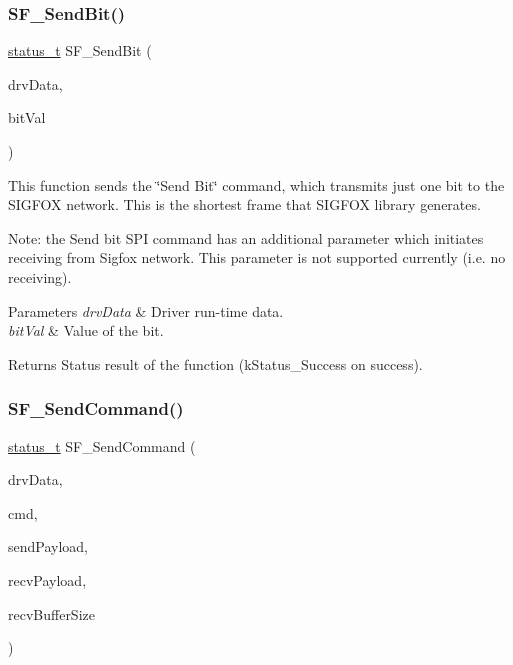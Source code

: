 \subsubsection{\texorpdfstring{SF\_SendBit()}{SF\_SendBit()}}
{\footnotesize\ttfamily \mbox{\hyperlink{group__ksdk__common_gaaabdaf7ee58ca7269bd4bf24efcde092}{status\+\_\+t}} S\+F\+\_\+\+Send\+Bit (\begin{DoxyParamCaption}\item[{\mbox{\hyperlink{structsf__drv__data__t}{sf\+\_\+drv\+\_\+data\+\_\+t}} $\ast$}]{drv\+Data,  }\item[{uint8\+\_\+t}]{bit\+Val }\end{DoxyParamCaption})}



This function sends the \char`\"{}\+Send Bit\char`\"{} command, which transmits just one bit to the S\+I\+G\+F\+OX network. This is the shortest frame that S\+I\+G\+F\+OX library generates. 

Note\+: the Send bit S\+PI command has an additional parameter which initiates receiving from Sigfox network. This parameter is not supported currently (i.\+e. no receiving).


\begin{DoxyParams}{Parameters}
{\em drv\+Data} & Driver run-\/time data. \\
\hline
{\em bit\+Val} & Value of the bit.\\
\hline
\end{DoxyParams}
\begin{DoxyReturn}{Returns}
Status result of the function (k\+Status\+\_\+\+Success on success). 
\end{DoxyReturn}
\mbox{\label{group__sf__functions__group_ga9c767a31660b3d561fdba39a47903295}} 
\subsubsection{\texorpdfstring{SF\_SendCommand()}{SF\_SendCommand()}}
{\footnotesize\ttfamily \mbox{\hyperlink{group__ksdk__common_gaaabdaf7ee58ca7269bd4bf24efcde092}{status\+\_\+t}} S\+F\+\_\+\+Send\+Command (\begin{DoxyParamCaption}\item[{\mbox{\hyperlink{structsf__drv__data__t}{sf\+\_\+drv\+\_\+data\+\_\+t}} $\ast$}]{drv\+Data,  }\item[{\mbox{\hyperlink{group__sf__enum__group_ga06921e348326a2db772246fef63b2545}{sf\+\_\+spi\+\_\+cmd\+\_\+t}}}]{cmd,  }\item[{const \mbox{\hyperlink{structsf__msg__payload__t}{sf\+\_\+msg\+\_\+payload\+\_\+t}} $\ast$}]{send\+Payload,  }\item[{\mbox{\hyperlink{structsf__msg__payload__t}{sf\+\_\+msg\+\_\+payload\+\_\+t}} $\ast$}]{recv\+Payload,  }\item[{uint8\+\_\+t}]{recv\+Buffer\+Size }\end{DoxyParamCaption})}



